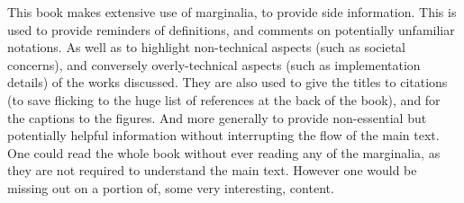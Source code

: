 \documentclass[12pt,parskip]{komatufte}
\begin{document}
This book makes extensive use of marginalia, to provide side information.
This is used to provide reminders of definitions, and comments on potentially unfamiliar notations.
As well as to highlight non-technical aspects (such as societal concerns), and conversely overly-technical aspects (such as implementation details) of the works discussed.
They are also used to give the titles to citations (to save flicking to the huge list of references at the back of the book), and for the captions to the figures.
And more generally to provide non-essential  but potentially helpful information without interrupting the flow of the main text.
One could read the whole book without ever reading any of the marginalia, as they are not required to understand the main text.
However one would be missing out on a portion of, some very interesting, content.

\printbib
\end{document}
